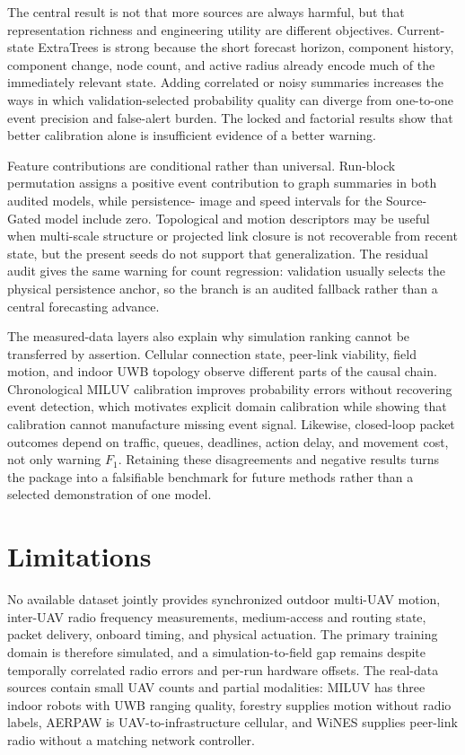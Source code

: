 \documentclass[final,5p,times,twocolumn]{elsarticle}
\begin{document}
The central result is not that more sources are always harmful, but that representation
richness and engineering utility are different objectives. Current-state ExtraTrees is
strong because the short forecast horizon, component history, component change, node count,
and active radius already encode much of the immediately relevant state. Adding correlated
or noisy summaries increases the ways in which validation-selected probability quality can
diverge from one-to-one event precision and false-alert burden. The locked and factorial
results show that better calibration alone is insufficient evidence of a better warning.

Feature contributions are conditional rather than universal. Run-block permutation assigns
a positive event contribution to graph summaries in both audited models, while persistence-
image and speed intervals for the Source-Gated model include zero. Topological and motion
descriptors may be useful when multi-scale structure or projected link closure is not
recoverable from recent state, but the present seeds do not support that generalization.
The residual audit gives the same warning for count regression: validation usually selects
the physical persistence anchor, so the branch is an audited fallback rather than a central
forecasting advance.

The measured-data layers also explain why simulation ranking cannot be transferred by
assertion. Cellular connection state, peer-link viability, field motion, and indoor UWB
topology observe different parts of the causal chain. Chronological MILUV calibration
improves probability errors without recovering event detection, which motivates explicit
domain calibration while showing that calibration cannot manufacture missing event signal.
Likewise, closed-loop packet outcomes depend on traffic, queues, deadlines, action delay,
and movement cost, not only warning $F_1$. Retaining these disagreements and negative results
turns the package into a falsifiable benchmark for future methods rather than a selected
demonstration of one model.

\section{Limitations}

No available dataset jointly provides synchronized outdoor multi-UAV motion, inter-UAV
radio frequency measurements, medium-access and routing state, packet delivery, onboard
timing, and physical actuation. The primary training domain is therefore simulated, and a
simulation-to-field gap remains despite temporally correlated radio errors and per-run
hardware offsets. The real-data sources contain small UAV counts and partial modalities:
MILUV has three indoor robots with UWB ranging quality, forestry supplies motion without
radio labels, AERPAW is UAV-to-infrastructure cellular, and WiNES supplies peer-link radio
without a matching network controller.
\end{document}
